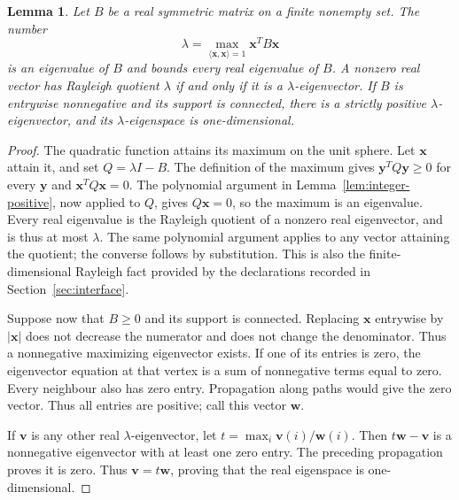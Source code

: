 \documentclass[11pt]{amsart}
\newcommand\Zv{{\mathbf v}}
\newcommand\Zw{{\mathbf w}}
\newcommand\Zy{{\mathbf y}}
\newcommand\Zx{{\mathbf x}}
\newcommand\ip[2]{\langle#1,#2\rangle}
\newtheorem{lemma}[theorem]{Lemma}
\theoremstyle{definition}
\newcommand{\lsq}[1]{\ip{#1}{#1}}
\begin{document}
\begin{lemma}\label{lem:rayleigh}
Let $B$ be a real symmetric matrix on a finite nonempty set. The number
\[
 \lambda=\max_{\lsq{\Zx}=1}\Zx^TB\Zx
\]
is an eigenvalue of $B$ and bounds every real eigenvalue of $B$.
A nonzero real vector has Rayleigh quotient $\lambda$ if and only if it is a
$\lambda$-eigenvector. If $B$ is entrywise nonnegative and its support is
connected, there is a strictly positive $\lambda$-eigenvector, and its
$\lambda$-eigenspace is one-dimensional.
\end{lemma}
\begin{proof}
The quadratic function attains its maximum on the unit sphere. Let $\Zx$
attain it, and set $Q=\lambda I-B$. The definition of the maximum gives
$\Zy^TQ\Zy\geq0$ for every $\Zy$ and $\Zx^TQ\Zx=0$.
The polynomial argument in Lemma~\ref{lem:integer-positive}, now applied
to $Q$, gives $Q\Zx=0$, so the maximum is an eigenvalue.
Every real eigenvalue is the Rayleigh quotient of a nonzero real
eigenvector, and is thus at most $\lambda$.
The same polynomial argument applies to any vector attaining the quotient;
the converse follows by substitution. This is also the finite-dimensional
Rayleigh fact provided by the declarations recorded in
Section~\ref{sec:interface}.

Suppose now that $B\geq0$ and its support is connected. Replacing $\Zx$
entrywise by $|\Zx|$ does not decrease the numerator and does not change the
denominator. Thus a nonnegative maximizing eigenvector exists. If one of
its entries is zero, the eigenvector equation at that vertex is a sum of
nonnegative terms equal to zero. Every neighbour also has zero entry.
Propagation along paths would give the zero vector. Thus all entries are
positive; call this vector $\Zw$.

If $\Zv$ is any other real $\lambda$-eigenvector, let
$t=\max_i\Zv(i)/\Zw(i)$. Then $t\Zw-\Zv$ is a nonnegative eigenvector
with at least one zero entry. The preceding propagation proves it is zero.
Thus $\Zv=t\Zw$, proving that the real eigenspace is one-dimensional.
\end{proof}
\end{document}

